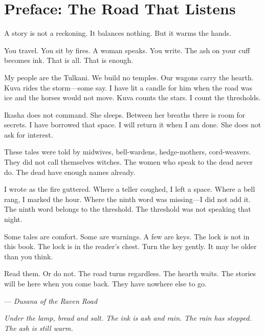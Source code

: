\chapter*{Preface: The Road That Listens}

A story is not a reckoning. It balances nothing. But it warms the hands.

\smallskip

You travel. You sit by fires. A woman speaks. You write. The ash on your cuff becomes ink. That is all. That is enough.

\smallskip

My people are the Tulkani. We build no temples. Our wagons carry the hearth. Kuva rides the storm---some say. I have lit a candle for him when the road was ice and the horses would not move. Kuva counts the stars. I count the thresholds.

\smallskip

Ikasha does not command. She sleeps. Between her breaths there is room for secrets. I have borrowed that space. I will return it when I am done. She does not ask for interest.

\smallskip

These tales were told by midwives, bell-wardens, hedge-mothers, cord-weavers. They did not call themselves witches. The women who speak to the dead never do. The dead have enough names already.

\smallskip

I wrote as the fire guttered. Where a teller coughed, I left a space. Where a bell rang, I marked the hour. Where the ninth word was missing---I did not add it. The ninth word belongs to the threshold. The threshold was not speaking that night.

\smallskip

Some tales are comfort. Some are warnings. A few are keys. The lock is not in this book. The lock is in the reader's chest. Turn the key gently. It may be older than you think.

\smallskip

Read them. Or do not. The road turns regardless. The hearth waits. The stories will be here when you come back. They have nowhere else to go.

\smallskip
\noindent --- \textit{Dusana of the Raven Road}

\noindent \textit{Under the lamp, bread and salt. The ink is ash and rain. The rain has stopped. The ash is still warm.}